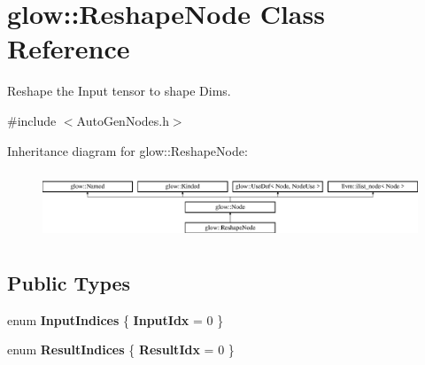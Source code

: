 \hypertarget{classglow_1_1_reshape_node}{}\section{glow\+:\+:Reshape\+Node Class Reference}
\label{classglow_1_1_reshape_node}


Reshape the Input tensor to shape Dims.  




{\ttfamily \#include $<$Auto\+Gen\+Nodes.\+h$>$}

Inheritance diagram for glow\+:\+:Reshape\+Node\+:\begin{figure}[H]
\begin{center}
\leavevmode
\includegraphics[height=2.028986cm]{classglow_1_1_reshape_node}
\end{center}
\end{figure}
\subsection*{Public Types}
\begin{DoxyCompactItemize}
\item 
\mbox{\label{classglow_1_1_reshape_node_aa04c04cbeb68e801f51f3e166fa40f52}} 
enum {\bfseries Input\+Indices} \{ {\bfseries Input\+Idx} = 0
 \}
\item 
\mbox{\label{classglow_1_1_reshape_node_ae6952a9921cb8065ef0290b3bb2be2ad}} 
enum {\bfseries Result\+Indices} \{ {\bfseries Result\+Idx} = 0
 \}
\end{DoxyCompactItemize}

